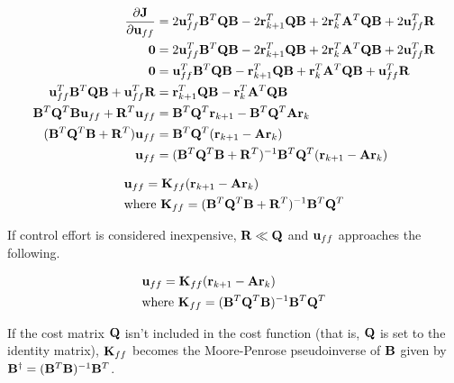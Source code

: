 \begin{align*}
  \frac{\partial\mathbf{J}}{\partial\mathbf{u}_{ff}} &=
    2\mathbf{u}_{ff}^T\mathbf{B}^T\mathbf{Q}\mathbf{B} - 2\mathbf{r}_{k+1}^T\mathbf{Q}\mathbf{B} +
    2\mathbf{r}_k^T\mathbf{A}^T\mathbf{Q}\mathbf{B} + 2\mathbf{u}_{ff}^T\mathbf{R} \\
  \mathbf{0} &= 2\mathbf{u}_{ff}^T\mathbf{B}^T\mathbf{Q}\mathbf{B} -
    2\mathbf{r}_{k+1}^T\mathbf{Q}\mathbf{B} + 2\mathbf{r}_k^T\mathbf{A}^T\mathbf{Q}\mathbf{B} +
    2\mathbf{u}_{ff}^T\mathbf{R} \\
  \mathbf{0} &= \mathbf{u}_{ff}^T\mathbf{B}^T\mathbf{Q}\mathbf{B} -
    \mathbf{r}_{k+1}^T\mathbf{Q}\mathbf{B} + \mathbf{r}_k^T\mathbf{A}^T\mathbf{Q}\mathbf{B} +
    \mathbf{u}_{ff}^T\mathbf{R} \\
  \mathbf{u}_{ff}^T\mathbf{B}^T\mathbf{Q}\mathbf{B} + \mathbf{u}_{ff}^T\mathbf{R} &=
    \mathbf{r}_{k+1}^T\mathbf{Q}\mathbf{B} - \mathbf{r}_k^T\mathbf{A}^T\mathbf{Q}\mathbf{B} \\
  \mathbf{B}^T\mathbf{Q}^T\mathbf{B}\mathbf{u}_{ff} + \mathbf{R}^T\mathbf{u}_{ff} &=
    \mathbf{B}^T\mathbf{Q}^T\mathbf{r}_{k+1} - \mathbf{B}^T\mathbf{Q}^T\mathbf{A}\mathbf{r}_k \\
  (\mathbf{B}^T\mathbf{Q}^T\mathbf{B} + \mathbf{R}^T)\mathbf{u}_{ff} &=
    \mathbf{B}^T\mathbf{Q}^T(\mathbf{r}_{k+1} - \mathbf{A}\mathbf{r}_k) \\
  \mathbf{u}_{ff} &= (\mathbf{B}^T\mathbf{Q}^T\mathbf{B} +
    \mathbf{R}^T)^{-1}\mathbf{B}^T\mathbf{Q}^T(\mathbf{r}_{k+1} - \mathbf{A}\mathbf{r}_k)
\end{align*}

\begin{theorem}
  \begin{align}
    &\mathbf{u}_{ff} = \mathbf{K}_{ff} (\mathbf{r}_{k+1} - \mathbf{A}\mathbf{r}_k) \\
    &\text{where } \mathbf{K}_{ff} =
      (\mathbf{B}^T\mathbf{Q}^T\mathbf{B} + \mathbf{R}^T)^{-1}\mathbf{B}^T\mathbf{Q}^T
  \end{align}
\end{theorem}

If control effort is considered inexpensive, $\mathbf{R} \ll \mathbf{Q}$ and
$\mathbf{u}_{ff}$ approaches the following.

\begin{theorem}
  \begin{align}
    &\mathbf{u}_{ff} = \mathbf{K}_{ff} (\mathbf{r}_{k+1} - \mathbf{A}\mathbf{r}_k) \\
    &\text{where } \mathbf{K}_{ff} =
      (\mathbf{B}^T\mathbf{Q}^T\mathbf{B})^{-1}\mathbf{B}^T\mathbf{Q}^T
  \end{align}
\end{theorem}

\begin{remark}
  If the cost matrix $\mathbf{Q}$ isn't included in the cost function (that is,
  $\mathbf{Q}$ is set to the identity matrix), $\mathbf{K}_{ff}$ becomes the
  Moore-Penrose pseudoinverse of $\mathbf{B}$ given by
  $\mathbf{B}^\dagger = (\mathbf{B}^T\mathbf{B})^{-1}\mathbf{B}^T$.
\end{remark}
